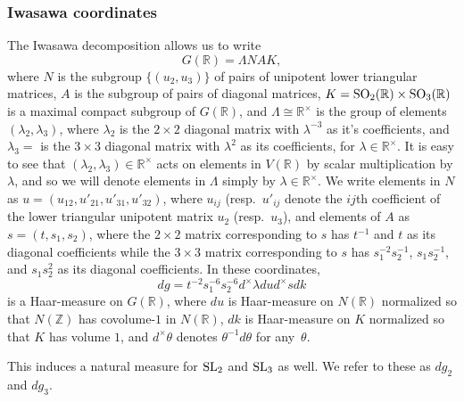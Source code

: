 \documentclass{article}
\def\Z{{\mathbb Z}}
\def\SL{{\rm SL}}
\def\SO{{\rm SO}}
\def\R{{\mathbb R}}
\def\Z{{\mathbb Z}}
\begin{document}
\subsubsection*{Iwasawa coordinates}
The Iwasawa decomposition allows us to write
\begin{equation*}
G(\R)=\Lambda NAK,
\end{equation*}
where $N$ is the subgroup $\{(u_2,u_3)\}$ of pairs of unipotent lower triangular matrices, $A$ is the subgroup of pairs of diagonal matrices, $K=\SO_2(\R)\times\SO_3(\R)$ is a maximal compact subgroup of $G(\R)$, and $\Lambda\cong\R^\times$ is the group of elements $(\lambda_2,\lambda_3)$, where $\lambda_2$ is the $2\times 2$ diagonal matrix with $\lambda^{-3}$ as it's coefficients, and $\lambda_3=$ is the $3\times 3$ diagonal matrix with $\lambda^2$ as its coefficients, for $\lambda\in\R^\times$. It is easy to see that $(\lambda_2,\lambda_3)\in\R^\times$ acts on elements in $V(\R)$ by scalar multiplication by $\lambda$, and so we will denote elements in $\Lambda$ simply by $\lambda\in\R^\times$. We write elements in $N$ as $u=(u_{12},u'_{21},u'_{31},u'_{32})$, where $u_{ij}$ (resp.\ $u'_{ij}$ denote the $ij$th coefficient of the lower triangular unipotent matrix $u_2$ (resp.\ $u_3$), and elements of $A$ as $s=(t,s_1,s_2)$, where the $2\times 2$ matrix corresponding to $s$ has $t^{-1}$ and $t$ as its diagonal coefficients while the $3\times 3$ matrix corresponding to $s$ has $s_1^{-2}s_2^{-1}$, $s_1s_2^{-1}$, and $s_1s_2^2$ as its diagonal coefficients. In these coordinates, 
\begin{equation*}
dg=t^{-2}s_1^{-6}s_2^{-6}d^\times\lambda dud^\times sdk
\end{equation*}
is a Haar-measure on $G(\R)$, where $du$ is Haar-measure on $N(\R)$ normalized so that $N(\Z)$ has covolume-$1$ in $N(\R)$, $dk$ is Haar-measure on $K$ normalized so that $K$ has volume $1$, and $d^\times\theta$ denotes $\theta^{-1}d\theta$ for any~$\theta$.

This induces a natural measure for $\SL_2$ and $\SL_3$ as well. We refer to these as $dg_2$ and $dg_3$. 
\end{document}
